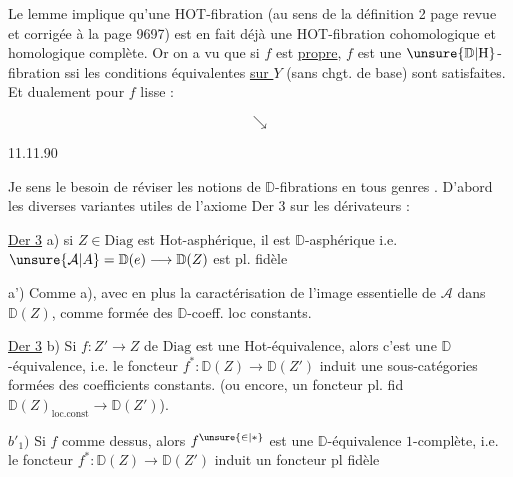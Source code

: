 

Le lemme implique qu'une HOT-fibration  (au sens de la définition 2 page   revue et corrigée à la page 96\unsure{,|-}97) est en fait déjà une HOT-fibration cohomologique et homologique complète. Or on a vu que si $f$ est \uline{propre}, $f$ est une $\unsure{\mathbb D|\mathrm{H}}$-fibration ssi les conditions équivalentes \uline{sur $Y$} (sans chgt. de base) sont satisfaites. Et dualement pour $f$ lisse :


\[
\searrow
\]

11.11.90

Je sens le besoin de réviser  les notions de $\mathbb D$-fibrations en tous genres . D'abord les diverses variantes utiles de l'axiome Der 3 sur les dérivateurs :


\uline{Der 3} a) si $Z\in\mathrm{Diag}$ est Hot-asphérique, il est $\mathbb D$-asphérique i.e. $\unsure{\mathcal A|A}=\mathbb D(e)\longrightarrow\mathbb D(Z)$ est pl. fidèle

a') Comme a), avec en plus la caractérisation de l'image essentielle de  $\mathcal A$ dans $\mathbb D(Z)$, comme formée des $\mathbb D$-coeff. loc constants.

\uline{Der 3} b) Si $f:Z'\to Z$ de $\mathrm{Diag}$ est une Hot-équivalence, alors c'est une $\mathbb D$-équivalence, i.e. le foncteur $f^*:\mathbb D(Z)\to\mathbb D(Z')$ induit une    sous-catégories formées des coefficients constants. (ou encore, un foncteur pl. fid $\mathbb D(Z)_{\mathrm{loc.const}}\longrightarrow\mathbb D(Z')$).

$b'_1)$ Si $f$ comme dessus, alors $f^{\unsure{\in|*}}$ est une $\mathbb D$-équivalence $1$-complète, i.e. le foncteur  $f^*:\mathbb D(Z)\to\mathbb D(Z')$ induit un foncteur pl fidèle

